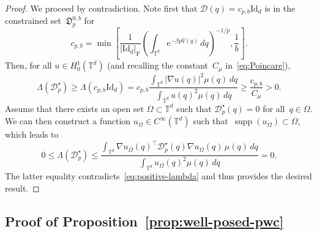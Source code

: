 \documentclass{article}
\newcommand{\dps}{\displaystyle }
\newcommand{\rme}{\mathrm{e}}
\newcommand{\Id}{\mathrm{Id}}
\renewcommand{\leq}{\leqslant}
\renewcommand{\geq}{\geqslant}
\def\T{\mathbb{T}}
\newcommand{\Diff}{\mathcal{D}}
\newcommand{\Diffset}{\mathfrak{D}}
\newcommand{\F}{\mathrm{F}}
\newcommand{\normF}[1]{\left| #1 \right|_{\F}}
\renewcommand{\dim}{d}
\begin{document}
\begin{proof}
  We proceed by contradiction. Note first that $\Diff(q) = c_{p,b}\Id_\dim$ is in the constrained set~$\Diffset_p^{0,b}$ for
  \[
  c_{p,b} = \min\left[  \frac{1}{\normF{\Id_\dim}} \left(\int_{\T^\dim} \rme^{-\beta p V(q)} \, dq\right)^{-1/p}, \frac1b\right].
  \]
  Then, for all $u\in H^1_0(\T^\dim)$ (and recalling the constant~$C_\mu$ in~\eqref{eq:Poincare}), 
  \begin{equation}
    \label{eq:positive-lambda}
    \Lambda(\Diff^{\star}_p) \geq \Lambda\left(c_{p,b} \Id_\dim\right) = c_{p,b} \frac{\dps \int_{\T^\dim}|\nabla u(q)|^2 \mu(q) \, dq}{\dps \int_{\T^\dim} u(q)^2 \mu(q) \, dq} \geq \frac{c_{p,b}}{C_{\mu}}>0. 
  \end{equation}
  Assume that there exists an open set $\Omega\subset \T^\dim$ such that $\Diff^{\star}_p(q) = 0$ for all~$q\in\Omega$. We can then construct a function $u_{\Omega}\in C^{\infty}(\T^\dim)$ such that~$\operatorname{supp}(u_{\Omega})\subset \Omega$, which leads to  
  \[
  0 \leq \Lambda(\Diff^{\star}_p)\leq \frac{\dps \int_{\T^\dim} \nabla u_{\Omega}(q)^\top \Diff^{\star}_p(q)\nabla u_{\Omega}(q) \, \mu(q) \, dq}{\dps \int_{\T^\dim} u_{\Omega}(q)^2 \mu(q) \, dq} = 0.
  \]
  The latter equality contradicts~\eqref{eq:positive-lambda} and thus provides the desired result.
\end{proof}

\subsection{Proof of Proposition~\ref{prop:well-posed-pwc}}
\label{app:prop:well-posec-pwc}
\end{document}
